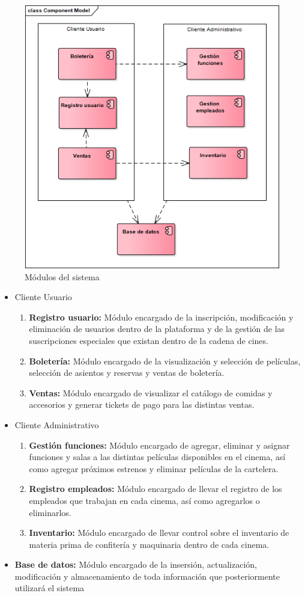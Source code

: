 \begin{figure}[h!]
	\centering
\includegraphics[width=0.7\linewidth]{proyecto/proceso/imgs/modulos}
	\caption{Módulos del sistema}
\end{figure}


\begin{itemize}
	\item{Cliente Usuario}
		\begin{enumerate}
			\item{\textbf{Registro usuario:} Módulo encargado de la inscripción, modificación y eliminación de usuarios dentro de la plataforma y de la gestión de las suscripciones especiales que existan dentro de la cadena de cines.}
			\item{\textbf{Boletería:} Módulo encargado de la visualización y selección de películas, selección de asientos y reservas y ventas de boletería.}
			\item{\textbf{Ventas:} Módulo encargado de visualizar el catálogo de comidas y accesorios y generar tickets de pago para las distintas ventas.}
		\end{enumerate}
	\item{Cliente Administrativo}
		\begin{enumerate}
			\item{\textbf{Gestión funciones:} Módulo encargado de agregar, eliminar y asignar funciones y salas a las distintas películas disponibles en el cinema, así como agregar próximos estrenos y eliminar películas de la cartelera.}
			\item{\textbf{Registro empleados:} Módulo encargado de llevar el registro de los empleados que trabajan en cada cinema, así como agregarlos o eliminarlos.}
			\item{\textbf{Inventario:} Módulo encargado de llevar control sobre el inventario de materia prima de confitería y maquinaria dentro de cada cinema.}
		\end{enumerate}
	\item{\textbf{Base de datos:} Módulo encargado de la insersión, actualización, modificación y almacenamiento de toda información que posteriormente utilizará el sistema}
\end{itemize}

